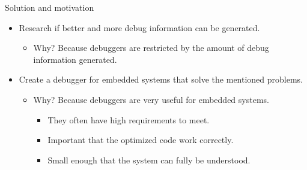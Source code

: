 \begin{frame}{Solution and motivation}
	\begin{itemize}
		\item Research if better and more debug information can be generated.
	    \begin{itemize}
        	\item Why? Because debuggers are restricted by the amount of debug information generated.
	    \end{itemize}
		\item Create a debugger for embedded systems that solve the mentioned problems.
	    \begin{itemize}
        	\item Why? Because debuggers are very useful for embedded systems.
	        \begin{itemize}
            		\item They often have high requirements to meet.
            		\item Important that the optimized code work correctly.
            		\item Small enough that the system can fully be understood.
	        \end{itemize}
	    \end{itemize}
	\end{itemize}
\end{frame}



